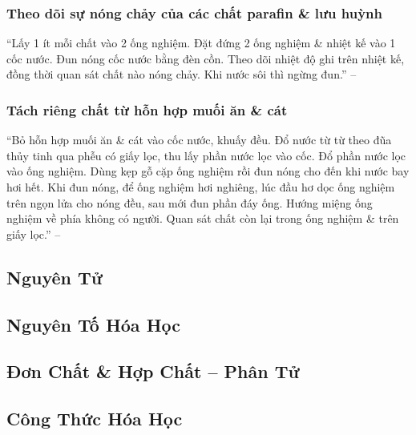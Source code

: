 \documentclass{article}
\numberwithin{equation}{section}
\begin{document}
\subsubsection{Theo dõi sự nóng chảy của các chất parafin \& lưu huỳnh}
``Lấy 1 ít mỗi chất vào 2 ống nghiệm. Đặt đứng 2 ống nghiệm \& nhiệt kế vào 1 cốc nước. Đun nóng cốc nước bằng đèn cồn. Theo dõi nhiệt độ ghi trên nhiệt kế, đồng thời quan sát chất nào nóng chảy. Khi nước sôi thì ngừng đun.'' -- \cite[p. 12]{SGK_Hoa_Hoc_8}

\subsubsection{Tách riêng chất từ hỗn hợp muối ăn \& cát}
``Bỏ hỗn hợp muối ăn \& cát vào cốc nước, khuấy đều. Đổ nước từ từ theo đũa thủy tinh qua phễu có giấy lọc, thu lấy phần nước lọc vào cốc. Đổ phần nước lọc vào ống nghiệm. Dùng kẹp gỗ cặp ống nghiệm rồi đun nóng cho đến khi nước bay hơi hết. Khi đun nóng, để ống nghiệm hơi nghiêng, lúc đầu hơ dọc ống nghiệm trên ngọn lửa cho nóng đều, sau mới đun phần đáy ống. Hướng miệng ống nghiệm về phía không có người. Quan sát chất còn lại trong ống nghiệm \& trên giấy lọc.'' -- \cite[p. 13]{SGK_Hoa_Hoc_8}


\subsection{Nguyên Tử}


\subsection{Nguyên Tố Hóa Học}


\subsection{Đơn Chất \& Hợp Chất -- Phân Tử}


\subsection{Công Thức Hóa Học}
\end{document}

